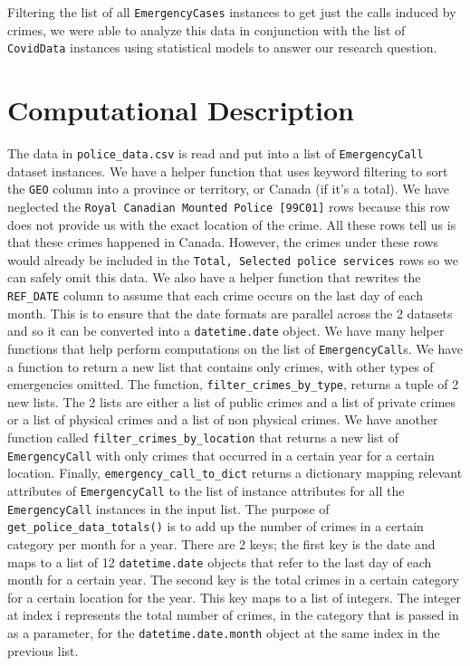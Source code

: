 \documentclass[fontsize=11pt]{article}
\begin{document}
Filtering the list of all \verb+EmergencyCases+ instances to get just the calls induced by crimes, we were able to analyze this data in conjunction with the list of \verb+CovidData+ instances using statistical models to answer our research question.


\section{Computational Description}
The data in \verb+police_data.csv+ is read and put into a list of \verb+EmergencyCall+ dataset instances. We have a helper function that uses keyword filtering to sort the \verb+GEO+ column into a province or territory, or Canada (if it’s a total). We have neglected the \verb+Royal Canadian Mounted Police [99C01]+ rows because this row does not provide us with the exact location of the crime. All these rows tell us is that these crimes happened in Canada. However, the crimes under these rows would already be included in the \verb+Total, Selected police services+ rows so we can safely omit this data. We also have a helper function that rewrites the \verb+REF_DATE+ column to assume that each crime occurs on the last day of each month. This is to ensure that the date formats are parallel across the 2 datasets and so it can be converted into a \verb+datetime.date+ object. We have many helper functions that help perform computations on the list of \verb+EmergencyCall+s. We have a function to return a new list that contains only crimes, with other types of emergencies omitted. The function, \verb+filter_crimes_by_type+, returns a tuple of 2 new lists. The 2 lists are either a list of public crimes and a list of private crimes or a list of physical crimes and a list of non physical crimes. We have another function called \verb+filter_crimes_by_location+ that returns a new list of \verb+EmergencyCall+ with only crimes that occurred in a certain year for a certain location. Finally, \verb+emergency_call_to_dict+ returns a dictionary mapping relevant attributes of \verb+EmergencyCall+ to the list of instance attributes for all the \verb+EmergencyCall+ instances in the input list. The purpose of \verb+get_police_data_totals()+ is to add up the number of crimes in a certain category per month for a year. There are 2 keys; the first key is the date and maps to a list of 12 \verb+datetime.date+ objects that refer to the last day of each month for a certain year. The second key is the total crimes in a certain category for a certain location for the year. This key maps to a list of integers. The integer at index i represents the total number of crimes,  in the category that is passed in as a parameter, for the \verb+datetime.date.month+ object at the same index in the previous list.
\end{document}
